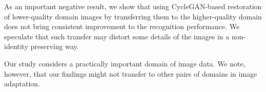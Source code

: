 
As an important negative result, we show that using CycleGAN-based restoration of lower-quality domain images by transferring them to the higher-quality domain does not bring consistent improvement to the recognition performance. We speculate that such transfer may distort some details of the images in a non-identity preserving way.

Our study considers a practically important domain of image data. 
We note, however, that our findings might not transfer to other pairs of domains in image adaptation.


 

